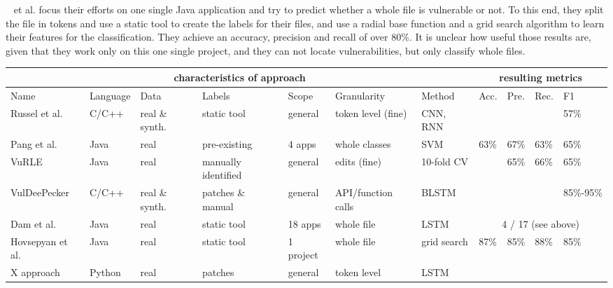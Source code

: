 \documentclass[
	a4paper,
	pagesize,
	pdftex,
	12pt,
	twoside, %
	BCOR=5mm, %
	ngerman,
	fleqn,
	final,
	]{scrartcl}
\begin{document}
~\cite{Hovsepyan.2012} et al. focus their efforts on one single Java application and try to predict whether a whole file is vulnerable or not. To this end, they split the file in tokens and use a static tool to create the labels for their files, and use a radial base function and a grid search algorithm to learn their features for the classification. They achieve an accuracy, precision and recall of over 80\%. It is unclear how useful those results are, given that they work only on this one single project, and they can not locate vulnerabilities, but only classify whole files. 
 
\scriptsize
\begin{tabular}{ | p{1.4cm} | p{1cm}|  p{0.8cm}| p{1.5cm} |  p{1.2cm} | p{1.5cm} | p{1.2cm} || p{0.4cm}|p{0.4cm}|p{0.4cm}|p{0.4cm}|  }
	\hline
	 \multicolumn{7}{|c||}{characteristics of approach} & \multicolumn{4}{c|}{resulting metrics} \\
	\hline
	 Name &  Language & Data & Labels & Scope &Granularity & Method & Acc. & Pre. & Rec. & F1  \\
	\hline
	Russel et al. & C/C++ & real \& synth. & static tool & general & token level (fine) & CNN, RNN &  &   &   &  57\%  \\
	\hline
	Pang et al. & Java & real  & pre-existing  & 4 apps & whole classes & SVM & 63\% & 67\%  & 63\%  & 65\%    \\
	\hline
	VuRLE & Java & real  & manually identified  & general & edits (fine) & 10-fold CV &  & 65\%  & 66\%  & 65\%    \\
	\hline
	VulDeePecker & C/C++ & real \& synth.  & patches \& manual & general & API/function calls & BLSTM &  &   &  & 85\%-95\%    \\
	\hline
	Dam et al. & Java & real &static tool & 18 apps & whole file & LSTM & \multicolumn{4}{c|}{ 4 / 17 (see above)}   \\
	\hline
	Hovsepyan et al. & Java & real  &static tool  & 1 project & whole file & grid search & 87\% & 	85\%  & 88\%  & 85\%   \\
	\hline
	X approach & Python & real  &patches& general  & token level & LSTM &  & &  &    \\
	\hline
	\hline 
\end{tabular}\\
\normalsize
\end{document}
